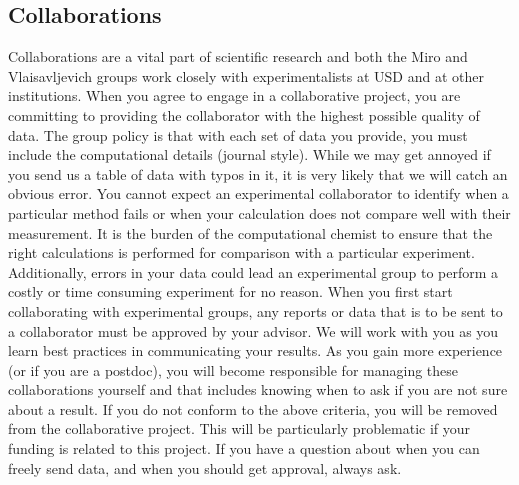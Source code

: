 \documentclass[letterpaper]{article}
\begin{document}
\subsection*{Collaborations}
Collaborations are a vital part of scientific research and both the Miro and Vlaisavljevich groups work closely with experimentalists at USD and at other institutions. When you agree to engage in a collaborative project, you are committing to providing the collaborator with the highest possible quality of data. The group policy is that with each set of data you provide, you must include the computational details (journal style). While we may get annoyed if you send us a table of data with typos in it, it is very likely that we will catch an obvious error. You cannot expect an experimental collaborator to identify when a particular method fails or when your calculation does not compare well with their measurement. It is the burden of the computational chemist to ensure that the right calculations is performed for comparison with a particular experiment. Additionally, errors in your data could lead an experimental group to perform a costly or time consuming experiment for no reason. When you first start collaborating with experimental groups, any reports or data that is to be sent to a collaborator must be approved by your advisor. We will work with you as you learn best practices in communicating your results. As you gain more experience (or if you are a postdoc), you will become responsible for managing these collaborations yourself and that includes knowing when to ask if you are not sure about a result. If you do not conform to the above criteria, you will be removed from the collaborative project. This will be particularly problematic if your funding is related to this project. If you have a question about when you can freely send data, and when you should get approval, always ask.

%
%
%
%



%
\end{document}

